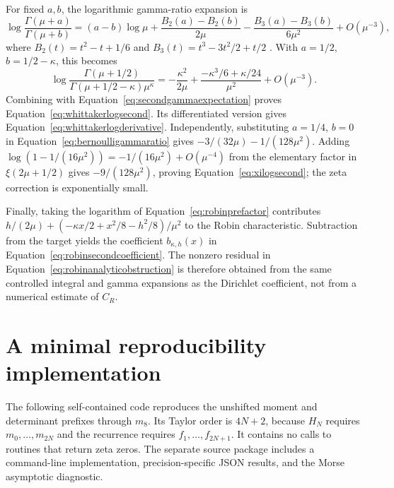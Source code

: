\documentclass[11pt,letterpaper]{article}
\numberwithin{equation}{section}
\theoremstyle{definition}
\theoremstyle{remark}
\begin{document}
For fixed $a,b$, the logarithmic gamma-ratio expansion is
\begin{equation}
 \log\frac{\Gamma(\mu+a)}{\Gamma(\mu+b)}
 =(a-b)\log\mu
  +\frac{B_2(a)-B_2(b)}{2\mu}
  -\frac{B_3(a)-B_3(b)}{6\mu^2}+O(\mu^{-3}),
 \label{eq:bernoulligammaratio}
\end{equation}
where $B_2(t)=t^2-t+1/6$ and $B_3(t)=t^3-3t^2/2+t/2$ \cite[Section~5.11]{dlmf}. With $a=1/2$, $b=1/2-\kappa$, this becomes
\begin{equation}
 \log\frac{\Gamma(\mu+1/2)}{\Gamma(\mu+1/2-\kappa)\mu^\kappa}
 =-\frac{\kappa^2}{2\mu}
   +\frac{-\kappa^3/6+\kappa/24}{\mu^2}+O(\mu^{-3}).
 \label{eq:secondwhittakergamma}
\end{equation}
Combining with Equation~\eqref{eq:secondgammaexpectation} proves Equation~\eqref{eq:whittakerlogsecond}. Its differentiated version gives Equation~\eqref{eq:whittakerlogderivative}. Independently, substituting $a=1/4$, $b=0$ in Equation~\eqref{eq:bernoulligammaratio} gives $-3/(32\mu)-1/(128\mu^2)$. Adding
$\log(1-1/(16\mu^2))=-1/(16\mu^2)+O(\mu^{-4})$ from the elementary factor in $\xi(2\mu+1/2)$ gives $-9/(128\mu^2)$, proving Equation~\eqref{eq:xilogsecond}; the zeta correction is exponentially small.

Finally, taking the logarithm of Equation~\eqref{eq:robinprefactor} contributes
$h/(2\mu)+(-\kappa x/2+x^2/8-h^2/8)/\mu^2$ to the Robin characteristic. Subtraction from the target yields the coefficient $b_{\kappa,h}(x)$ in Equation~\eqref{eq:robinsecondcoefficient}. The nonzero residual in Equation~\eqref{eq:robinanalyticobstruction} is therefore obtained from the same controlled integral and gamma expansions as the Dirichlet coefficient, not from a numerical estimate of $C_R$.

\section{A minimal reproducibility implementation}
\label{app:code}
The following self-contained code reproduces the unshifted moment and determinant prefixes through $m_8$. Its Taylor order is $4N+2$, because $H_N$ requires $m_0,\ldots,m_{2N}$ and the recurrence requires $f_1,\ldots,f_{2N+1}$. It contains no calls to routines that return zeta zeros. The separate source package includes a command-line implementation, precision-specific JSON results, and the Morse asymptotic diagnostic.
\end{document}
